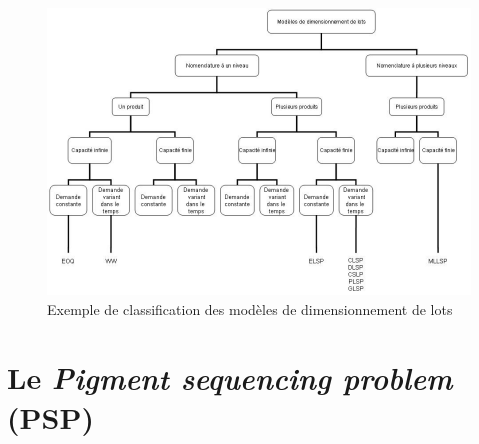 	\begin{center}
		\begin{figure}[!h]
			\includegraphics[scale=.5]{images/classification_dimensionnement.png}
			\caption{Exemple de classification des modèles de dimensionnement de lots \cite{cathy}}
			\label{fig:classification_dimensionnement_lots}
		\end{figure}
	\end{center}

	\newpage
	
	\section{Le \emph{Pigment sequencing problem} (PSP)}
	
